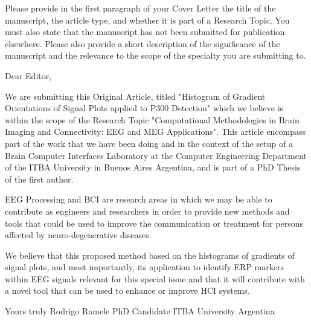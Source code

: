 Please provide in the first paragraph of your Cover Letter the title of the manuscript, the article type, and whether it is part of a Research Topic. You must also state that the manuscript has not been submitted for publication elsewhere. Please also provide a short description of the significance of the manuscript and the relevance to the scope of the specialty you are submitting to.

Dear Editor, 

We are submitting this Original Article, titled "Histogram of Gradient Orientations of Signal Plots applied to P300 Detection" which we believe is within the scope of the Research Topic "Computational Methodologies in Brain Imaging and Connectivity: EEG and MEG Applications".  This article encompass part of the work that we have been doing and in the context of the setup of a Brain Computer Interfaces Laboratory at the Computer Engineering Department of the ITBA University in Buenos Aires Argentina, and is part of a PhD Thesis of the first author.

EEG Processing and BCI are research areas in which we may be able to contribute as engineers and researchers in order to provide new methods and tools that could be used to improve the communication or treatment for persons affected by neuro-degenerative diseases.

We believe that this proposed method based on the histograms of gradients of signal plots, and most importantly, its  application to identify ERP markers within EEG signals relevant for this special issue and that it will contribute with a novel tool that can be used to enhance or improve HCI systems.

Yours truly
Rodrigo Ramele
PhD Candidate
ITBA University 
Argentina